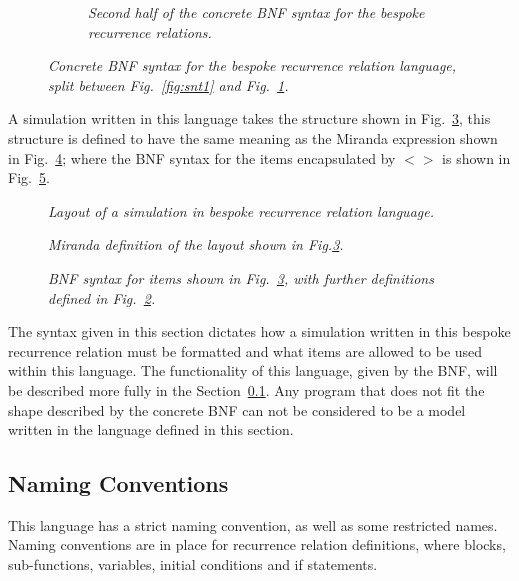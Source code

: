 \documentclass{article}
\begin{document}
\begin{figure}[H]\ContinuedFloat
	\centering
	\begin{subfigure}[b]{1\textwidth}
	
	\caption{\it Second half of the concrete BNF syntax for the bespoke recurrence relations.}
        \label{fig:snt2}
	\end{subfigure}
	\caption{\it Concrete BNF syntax for the bespoke recurrence relation language, split between Fig.~\ref{fig:snt1} and Fig.~\ref{fig:snt2}.}
	\label{fig:bnflex}
\end{figure} 




A simulation written in this language takes the structure shown in Fig.~\ref{fig:befroemira}, this structure is defined to have the same meaning as the Miranda expression shown in Fig.~\ref{fig:miramean}; where the BNF syntax for the items encapsulated by $<>$ is shown in Fig.~\ref{fig:structuredefs}.

\begin{figure}[H]
	\centering
	
	\caption{\it Layout of a simulation in bespoke recurrence relation language.}
	\label{fig:befroemira}
\end{figure} 

\begin{figure}[H]
	\centering
	
	\caption{\it Miranda definition of the layout shown in Fig.\ref{fig:befroemira}.}
	\label{fig:miramean}
\end{figure} 

\begin{figure}[H]
	\centering
	
	\caption{\it BNF syntax for items shown in Fig.~\ref{fig:befroemira}, with further definitions defined in Fig.~\ref{fig:bnflex}.}
	\label{fig:structuredefs}
\end{figure} 

The syntax given in this section dictates how a simulation written in this bespoke recurrence relation must be formatted and what items are allowed to be used within this language. The functionality of this language, given by the BNF, will be described more fully in the Section~\ref{nameconv}. Any program that does not fit the shape described by the concrete BNF can not be considered to be a model written in the language defined in this section.  



\subsection{Naming Conventions} \label{nameconv}
This language has a strict naming convention, as well as some restricted names. Naming conventions are in place for recurrence relation definitions, where blocks, sub-functions, variables, initial conditions and  if statements. 
\end{document}
